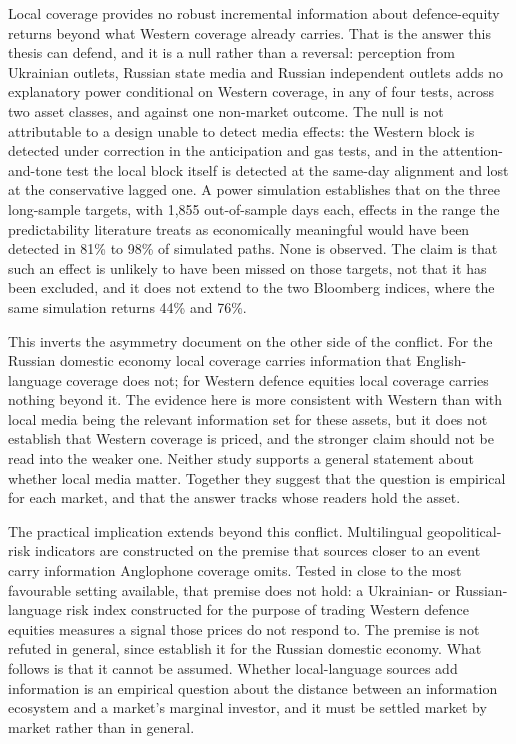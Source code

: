 \documentclass[12pt,a4paper]{article}
\begin{document}
Local coverage provides no robust incremental information about defence-equity returns beyond what Western coverage already carries. That is the answer this thesis can defend, and it is a null rather than a reversal: perception from Ukrainian outlets, Russian state media and Russian independent outlets adds no explanatory power conditional on Western coverage, in any of four tests, across two asset classes, and against one non-market outcome. The null is not attributable to a design unable to detect media effects: the Western block is detected under correction in the anticipation and gas tests, and in the attention-and-tone test the local block itself is detected at the same-day alignment and lost at the conservative lagged one. A power simulation establishes that on the three long-sample targets, with 1,855 out-of-sample days each, effects in the range the predictability literature treats as economically meaningful would have been detected in 81\% to 98\% of simulated paths. None is observed. The claim is that such an effect is unlikely to have been missed on those targets, not that it has been excluded, and it does not extend to the two Bloomberg indices, where the same simulation returns 44\% and 76\%.

This inverts the asymmetry \citet{bondarenko2024} document on the other side of the conflict. For the Russian domestic economy local coverage carries information that English-language coverage does not; for Western defence equities local coverage carries nothing beyond it. The evidence here is more consistent with Western than with local media being the relevant information set for these assets, but it does not establish that Western coverage is priced, and the stronger claim should not be read into the weaker one. Neither study supports a general statement about whether local media matter. Together they suggest that the question is empirical for each market, and that the answer tracks whose readers hold the asset.

The practical implication extends beyond this conflict. Multilingual geopolitical-risk indicators are constructed on the premise that sources closer to an event carry information Anglophone coverage omits. Tested in close to the most favourable setting available, that premise does not hold: a Ukrainian- or Russian-language risk index constructed for the purpose of trading Western defence equities measures a signal those prices do not respond to. The premise is not refuted in general, since \citet{bondarenko2024} establish it for the Russian domestic economy. What follows is that it cannot be assumed. Whether local-language sources add information is an empirical question about the distance between an information ecosystem and a market's marginal investor, and it must be settled market by market rather than in general.
\end{document}
